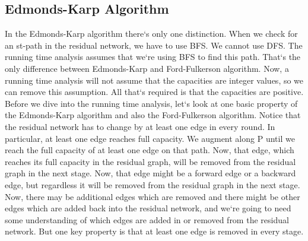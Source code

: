 \subsection{Edmonds-Karp Algorithm}
In the Edmonds-Karp algorithm there`s only one distinction.
When we check for an st-path in the residual network, we have to use BFS\@.
We cannot use DFS\@.
The running time analysis assumes that we`re using BFS to find this path.
That`s the only difference between Edmonds-Karp and Ford-Fulkerson algorithm.
Now, a running time analysis will not assume that the capacities are integer values, so we can remove this assumption.
All that`s required is that the capacities are positive.
Before we dive into the running time analysis, let`s look at one basic property of the Edmonds-Karp algorithm and also the Ford-Fulkerson algorithm.
Notice that the residual network has to change by at least one edge in every round.
In particular, at least one edge reaches full capacity.
We augment along P until we reach the full capacity of at least one edge on that path.
Now, that edge, which reaches its full capacity in the residual graph, will be removed from the residual graph in the next stage.
Now, that edge might be a forward edge or a backward edge, but regardless it will be removed from the residual graph in the next stage.
Now, there may be additional edges which are removed and there might be other edges which are added back into the residual network, and we`re going to need some understanding of which edges are added in or removed from the residual network.
But one key property is that at least one edge is removed in every stage.

